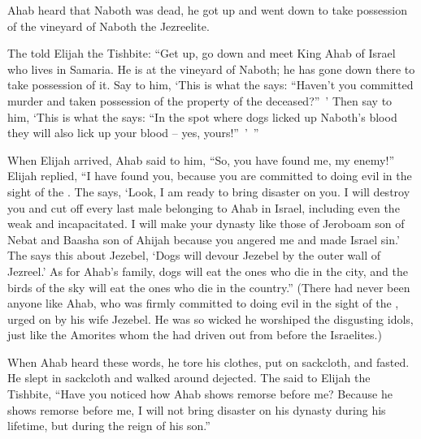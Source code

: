 {Ahab
heard
that
Naboth
was dead,
he
got up
and went down
to
take possession
of the vineyard
of Naboth
the Jezreelite.
\par }{\PP {}The
{}
told
Elijah
the Tishbite:
“Get
up, go down
and meet
King
Ahab
of Israel
who
lives in Samaria.
He is at
the vineyard
of Naboth;
he has gone down
there
to take possession of it.
Say
to
him, ‘This is what
the {}
says: “Haven’t you committed murder
and taken possession
of the property of the deceased?” ’ Then say
to
him, ‘This is what
the {}
says: “In the spot
where
dogs
licked up
Naboth’s
blood
they
will also
lick
up your
blood – yes, yours!” ’ ”
\par }{\PP {}When Elijah
arrived, Ahab
said
to him, “So, you have found
me, my enemy!” Elijah replied,
“I have found
you, because
you are committed
to doing
evil
in the sight
of the
{}.
The
{} says, ‘Look,
I am ready to bring
disaster
on
you. I will destroy
you and cut off
every last male
belonging to Ahab
in Israel,
including even the weak
and incapacitated.
I will make
your dynasty
like those of Jeroboam
son
of Nebat
and Baasha
son
of Ahijah
because
you angered
me and made Israel
sin.’
The
{}
says
this about
Jezebel,
‘Dogs
will devour
Jezebel
by the outer
wall of Jezreel.’
As for Ahab’s
family, dogs
will eat
the ones
who die
in the city,
and the birds
of the sky
will eat
the ones who die in the country.”
(There
had
never
been
anyone like Ahab,
who
was firmly committed
to doing
evil
in the sight
of the
{}, urged
on by his wife
Jezebel.
He was
so
wicked
he worshiped
the disgusting
idols,
just
like the Amorites
whom
the {}
had driven
out from before
the Israelites.)
\par }{\PP {}When
Ahab
heard
these
words,
he tore
his clothes,
put
on sackcloth,
and fasted.
He slept
in sackcloth
and walked
around dejected.
The
{}
said
to
Elijah
the Tishbite,
“Have
you noticed
how Ahab
shows remorse
before
me? Because
he shows remorse
before
me, I will not
bring
disaster
on
his dynasty
during
his lifetime,
but during the reign of his son.”

}
